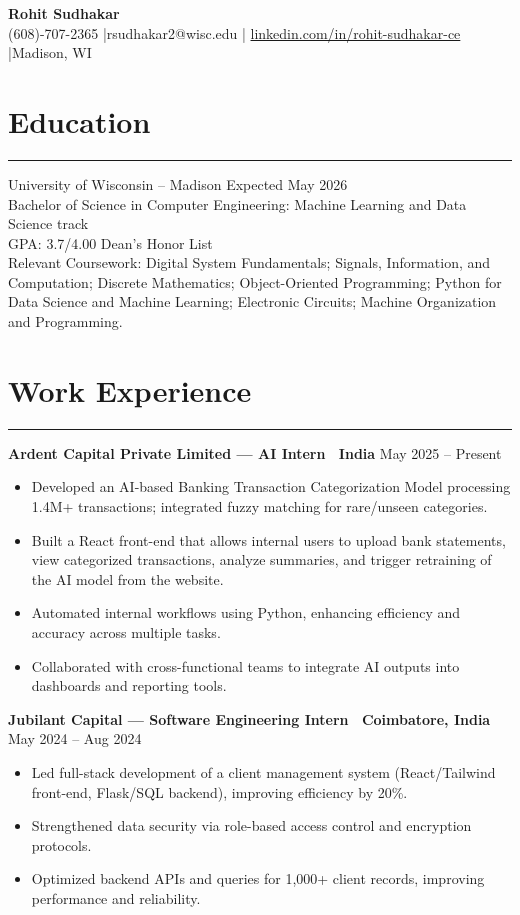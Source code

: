\documentclass[a4paper]{article}
\newcommand{\sectionline}{%
  \par\vspace{0.2ex}%
  \noindent\rule{\linewidth}{0.25pt}%
  \par\vspace{0.2ex}%
}
\newcommand{\entryspace}{\vspace{0.35em}}
\begin{document}
\begin{center}
    \textbf{\Large Rohit Sudhakar}\\[-0.25ex]
    (608)-707-2365 \quad|\quad rsudhakar2@wisc.edu \quad|\quad
    \href{https://www.linkedin.com/in/rohit-sudhakar-ce/}{linkedin.com/in/rohit-sudhakar-ce} \quad|\quad Madison, WI
\end{center}

\section*{Education}
\sectionline
University of Wisconsin – Madison \hfill Expected May 2026\\
Bachelor of Science in Computer Engineering: Machine Learning and Data Science track\\
GPA: 3.7/4.00 \hfill Dean’s Honor List\\
Relevant Coursework: Digital System Fundamentals; Signals, Information, and Computation; Discrete Mathematics; Object-Oriented Programming; Python for Data Science and Machine Learning; Electronic Circuits; Machine Organization and Programming.

\section*{Work Experience}
\sectionline

\textbf{Ardent Capital Private Limited — AI Intern \textbar\ India} \hfill May 2025 – Present
\begin{itemize}
    \item Developed an AI-based Banking Transaction Categorization Model processing 1.4M+ transactions; integrated fuzzy matching for rare/unseen categories.
    \item Built a React front-end that allows internal users to upload bank statements, view categorized transactions, analyze summaries, and trigger retraining of the AI model from the website.
    \item Automated internal workflows using Python, enhancing efficiency and accuracy across multiple tasks.
    \item Collaborated with cross-functional teams to integrate AI outputs into dashboards and reporting tools.
\end{itemize}
\entryspace

\textbf{Jubilant Capital — Software Engineering Intern \textbar\ Coimbatore, India} \hfill May 2024 – Aug 2024
\begin{itemize}
    \item Led full-stack development of a client management system (React/Tailwind front-end, Flask/SQL backend), improving efficiency by 20\%.
    \item Strengthened data security via role-based access control and encryption protocols.
    \item Optimized backend APIs and queries for 1,000+ client records, improving performance and reliability.
\end{itemize}
\entryspace
\end{document}
